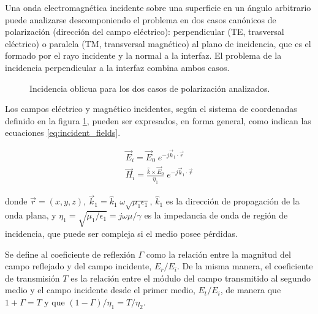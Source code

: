 Una onda electromagnética incidente sobre una superficie en un ángulo arbitrario puede analizarse descomponiendo el problema en dos casos canónicos de polarización (dirección del campo eléctrico): perpendicular (TE, trasversal eléctrico) o paralela (TM, transversal magnético) al plano de incidencia, que es el formado por el rayo incidente y la normal a la interfaz. El problema de la incidencia perpendicular a la interfaz combina ambos casos.

\begin{figure} [H]
	\centering 
	\hspace{5mm}
	\caption{Incidencia oblicua para los dos casos de polarización analizados.}
	\label{fig:oblique_incidence}
\end{figure}

Los campos eléctrico y magnético incidentes, según el sistema de coordenadas definido en la figura \ref{fig:oblique_incidence}, pueden ser expresados, en forma general, como indican las ecuaciones \ref{eq:incident_fields}.

\begin{subequations}
	\label{eq:incident_fields}
	\begin{align}
	\vec{E}_i = \vec{E}_0 \;e^{-j\vec{k}_1 \cdot \vec{r}} \\
	\vec{H}_i = \frac{\hat{k} \times \vec{E}_0}{\eta_1} \;e^{-j\vec{k}_1 \cdot \vec{r}}
	\end{align}
\end{subequations}

donde $\vec{r}=(x,y,z)$, $\vec{k}_1 = \hat{k}_1 \;\omega \sqrt{\mu_1 \epsilon_1}$, $\hat{k}_1$ es la dirección de propagación de la onda plana, y $\eta_1 = \sqrt{\mu_1 / \epsilon_1} = j\omega \mu / \gamma$ es la impedancia de onda de región de incidencia, que puede ser compleja si el medio posee pérdidas.

Se define al coeficiente de reflexión $\Gamma$ como la relación entre la magnitud del campo reflejado y del campo incidente, $E_r / E_i$. De la misma manera, el coeficiente de transmisión $T$ es la relación entre el módulo del campo transmitido al segundo medio y el campo incidente desde el primer medio, $E_t / E_i$, de manera que $1+\Gamma = T$ y que $(1-\Gamma)/\eta_1 = T/\eta_2$. 

